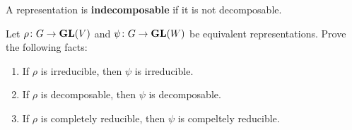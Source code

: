 A representation is 
\textbf{indecomposable} if it is not decomposable. 

\begin{exercise}
\label{xca:equivalence}
	Let $\rho\colon G\to\mathbf{GL}(V)$ and $\psi\colon G\to\mathbf{GL}(W)$ be equivalent representations.
	Prove the following facts:
	\begin{enumerate}
		\item If $\rho$ is irreducible, then $\psi$ is irreducible.
		\item If $\rho$ is decomposable, then $\psi$ is decomposable.
		\item If $\rho$ is completely reducible, then $\psi$ is compeltely reducible. 
	\end{enumerate}	
\end{exercise}

